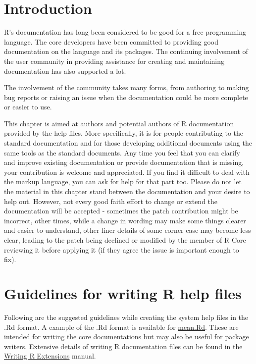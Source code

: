 \documentclass[
]{book}
\begin{document}
\hypertarget{introduction-2}{%
\section{Introduction}\label{introduction-2}}

R's documentation has long been considered to be good for a free programming language. The core developers have been committed to providing good documentation on the language and its packages. The continuing involvement of the user community in providing assistance for creating and maintaining documentation has also supported a lot.

The involvement of the community takes many forms, from authoring to making bug reports or raising an issue when the documentation could be more complete or easier to use.

This chapter is aimed at authors and potential authors of R documentation provided by the help files. More specifically, it is for people contributing to the standard documentation and for those developing additional documents using the same tools as the standard documents. Any time you feel that you can clarify and improve existing documentation or provide documentation that is missing, your contribution is welcome and appreciated. If you find it difficult to deal with the markup language, you can ask for help for that part too. Please do not let the material in this chapter stand between the documentation and your desire to help out. However, not every good faith effort to change or extend the documentation will be accepted - sometimes the patch contribution might be incorrect, other times, while a change in wording may make some things clearer and easier to understand, other finer details of some corner case may become less clear, leading to the patch being declined or modified by the member of R Core reviewing it before applying it (if they agree the issue is important enough to fix).

\hypertarget{guidelines-for-writing-r-help-files}{%
\section{Guidelines for writing R help files}\label{guidelines-for-writing-r-help-files}}

Following are the suggested guidelines while creating the system help files in the .Rd format. A example of the .Rd format is available for \href{https://svn.r-project.org/R/trunk/src/library/base/man/mean.Rd}{mean.Rd}. These are intended for writing the core documentations but may also be useful for package writers. Extensive details of writing R documentation files can be found in the \href{https://cran.r-project.org/doc/manuals/r-release/R-exts.html\#Writing-R-documentation-files}{Writing R Extensions} manual.
\end{document}
